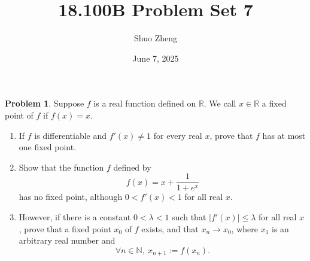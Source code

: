 \documentclass{amsart}
\title{18.100B Problem Set 7}
\author{Shuo Zheng}
\date{June 7, 2025}
\theoremstyle{definition}
\newtheorem{problem}{Problem}
\begin{document}
\maketitle

\begin{problem}
    Suppose $f$ is a real function defined on $\mathbb{R}$. We call $x \in \mathbb{R}$ a fixed point of $f$ if $f(x) = x$.
    \begin{enumerate}[label = (\alph*)]
    \item If $f$ is diﬀerentiable and $f'(x) \neq 1$ for every real $x$, prove that $f$ has at most one fixed point.
    \item  Show that the function $f$ defined by
    \[
    f(x) = x + \frac{1}{1 + e^x}
    \]
    has no fixed point, although $0 < f'(x) < 1$ for all real $x$.
    \item However, if there is a constant $0 < \lambda < 1$ such that $\vert f'(x) \vert \leq \lambda$ for all real $x$, prove that a fixed point $x_0$ of $f$ exists, and that $x_n \to x_0$, where $x_1$ is an arbitrary real number and
    \[
    \forall n \in \mathbb{N}, \ x_{n+1} := f(x_n).
    \]
    \end{enumerate}
\end{problem}
\end{document}
